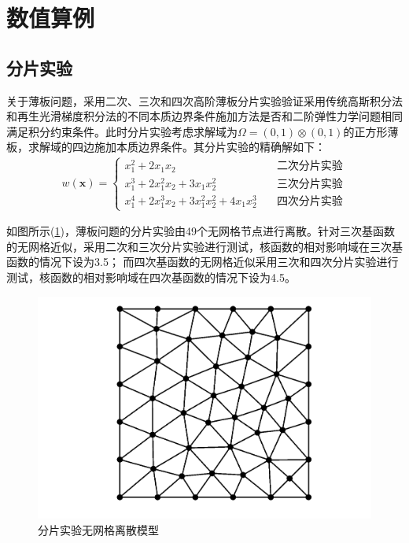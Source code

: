 \section{数值算例}
\subsection{分片实验}
关于薄板问题，采用二次、三次和四次高阶薄板分片实验验证采用传统高斯积分法和再生光滑梯度积分法的不同本质边界条件施加方法是否和二阶弹性力学问题相同
满足积分约束条件。此时分片实验考虑求解域为$\Omega=(0,1)\otimes(0,1)$的正方形薄板，求解域的四边施加本质边界条件。其分片实验的精确解如下：
\begin{equation}
\begin{split}
    w(\pmb{x})=\begin{cases}
        x_1^2+2x_1x_2\quad &\text{二次分片实验}\\
        x_1^3+2x_1^2x_2+3x_1x_2^2\quad &\text{三次分片实验}\\
        x_1^4+2x_1^3x_2+3x_1^2x_2^2+4x_1x_2^3\quad&\text{四次分片实验}
    \end{cases}
\end{split}
\end{equation}\par
如图所示(\ref{fenpian})，薄板问题的分片实验由49个无网格节点进行离散。针对三次基函数的无网格近似，采用二次和三次分片实验进行测试，核函数的相对影响域在三次基函数的情况下设为3.5；
而四次基函数的无网格近似采用三次和四次分片实验进行测试，核函数的相对影响域在四次基函数的情况下设为4.5。\par
\begin{figure}[H]
    \centering
    \includegraphics[scale=0.7]{figure/PHR/fenpian.png}
    \caption{分片实验无网格离散模型}\label{fenpian}
\end{figure}
